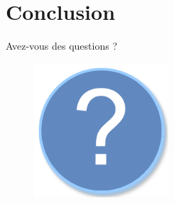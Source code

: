 \documentclass{beamer}
\begin{document}
\section*{Conclusion}%
\begin{frame}
	
\end{frame}

\begin{frame}{Avez-vous des questions ?}
	\begin{figure}[H]
		\centering
		\includegraphics[width=5cm]{interrogation.png}
	\end{figure}
\end{frame}
\end{document}
